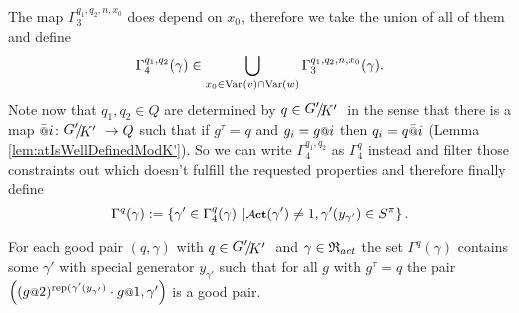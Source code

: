 \documentclass[a4paper,11pt]{amsart}
\begin{document}
 The map $\Gamma_3^{q_1,q_2,n,x_0}$ does depend on $x_0$, therefore we take the union of all of them and define
  \[\Gamma_4^{q_1,q_2}(\gamma)\in \bigcup_{x_0\in \textup{Var}(v)\cap\textup{Var}(w)}\Gamma_3^{q_1,q_2,n,x_0}(\gamma).\]
 Note now that $q_{1},q_2\in Q$ are determined by $q\in\RNK{G'}{K'}$ in the sense that there is a map $\att{i}\colon \RNK{G'}{K'}\to Q$ such that if $g^\tau = q$ and $g_i=g\at{i}$ 
 then $q_i = q\att{i}$ (Lemma \ref{lem:atIsWellDefinedModK'}). So we can write $\Gamma_4^{q_1,q_2}$ as $\Gamma_4^q$ instead and filter those 
 constraints out which doesn't fulfill the requested properties and therefore finally define
 \[\Gamma^q(\gamma) := \left\{\gamma' \in \Gamma_4^q(\gamma) \bigmid 
  \act(\gamma')\neq 1, \gamma'({y_{\gamma'}}) \in S^\pi \right\}.\]
 \begin{pro}\label{pro:existsNextPair}
 For each good pair $(q,\gamma)$ with $q\in\RNK{G'}{K'}$ and $\gamma\in\mathfrak{R}_{act}$ the set $\Gamma^q(\gamma)$ 
 contains some $\gamma'$ with special generator $y_{\gamma'}$ such that for all $g$ with $g^\tau=q$ the
 pair $\left((g\at{2})^{\textup{rep}(\gamma'(y_{\gamma'})}\cdot g\at{1},\gamma'\right)$ is a good pair.
\end{pro}
\end{document}
